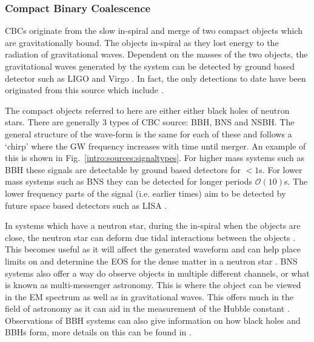 \subsubsection{\label{sources:transient:cbc} Compact Binary Coalescence}

\glspl{CBC} originate from the slow in-spiral and merge of two compact objects which are gravitationally bound.
The objects in-spiral as they lost energy to the radiation of gravitational waves.
Dependent on the masses of the two objects, the gravitational waves generated by the system can be detected by ground based detector such as LIGO \citep{aasi2015AdvancedLIGO} and Virgo \citep{acernese2015AdvancedVirgo}. 
In fact, the only detections to date have been originated from this source which include \citep{abbott2016ObservationGravitational, abbott2017GW170814ThreeDetector, abbott2017GW170817Observation}.

The compact objects referred to here are either either black holes of neutron stars.
There are generally 3 types of \gls{CBC} source: \gls{BBH}, \gls{BNS} and \gls{NSBH}.
The general structure of the wave-form is the same for each of these and follows a `chirp' where the \gls{GW} frequency increases with time until merger. An example of this is shown in Fig.~\ref{intro:sources:signaltypes}.
For higher mass systems such as \gls{BBH} these signals are detectable by ground based detectors for $< 1$s. 
For lower mass systems such as \gls{BNS} they can be detected for longer periods $\mathcal{O}(10)$s. 
The lower frequency parts of the signal (i.e. earlier times) aim to be detected by future space based detectors such as \gls{LISA} \citep{danzmann1996LISALaser}.

In systems which have a neutron star, during the in-spiral when the objects are close, the neutron star can deform due tidal interactions between the objects \citep{hernandezvivanco2019MeasuringNeutron,harry2018ObservingMeasuring}. 
This becomes useful as it will affect the generated waveform and can help place limits on and determine the \gls{EOS} for the dense matter in a neutron star \citep{hernandezvivanco2019MeasuringNeutron,harry2018ObservingMeasuring}.
\gls{BNS} systems also offer a way do observe objects in multiple different channels, or what is known as multi-messenger astronomy. 
This is where the object can be viewed in the \gls{EM} spectrum as well as in gravitational waves.
This offers much in the field of astronomy as it can aid in the measurement of the Hubble constant \citep{theligoscientificcollaborationandthevirgocollaboration2017GravitationalwaveStandard}. 
Observations of \gls{BBH} systems can also give information on how black holes and \glspl{BBH} form, more details on this can be found in \citep{zevin2017ConstrainingFormation,mandel2018MergingStellarmass}.


